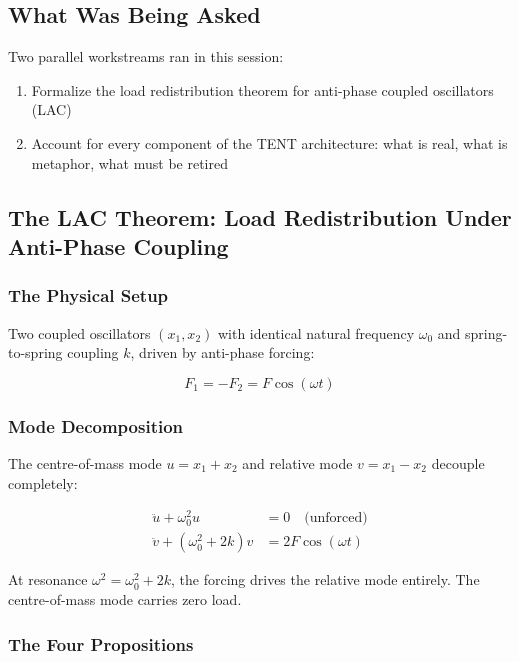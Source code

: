 \documentclass[11pt]{article}
\begin{document}
\subsection{What Was Being Asked}

Two parallel workstreams ran in this session:

\begin{enumerate}
  \item Formalize the load redistribution theorem for anti-phase coupled oscillators (LAC)
  \item Account for every component of the TENT architecture: what is real, what is metaphor, what must be retired
\end{enumerate}

\subsection{The LAC Theorem: Load Redistribution Under Anti-Phase Coupling}

\subsubsection{The Physical Setup}

Two coupled oscillators $(x_1, x_2)$ with identical natural frequency $\omega_0$ and spring-to-spring coupling $k$, driven by anti-phase forcing:

\begin{equation}
  F_1 = -F_2 = F\cos(\omega t)
\end{equation}

\subsubsection{Mode Decomposition}

The centre-of-mass mode $u = x_1 + x_2$ and relative mode $v = x_1 - x_2$ decouple completely:

\begin{align}
  \ddot{u} + \omega_0^2 u &= 0 \quad \text{(unforced)}\\
  \ddot{v} + (\omega_0^2 + 2k) v &= 2F\cos(\omega t)
\end{align}

At resonance $\omega^2 = \omega_0^2 + 2k$, the forcing drives the relative mode entirely. The centre-of-mass mode carries zero load.

\subsubsection{The Four Propositions}
\end{document}
